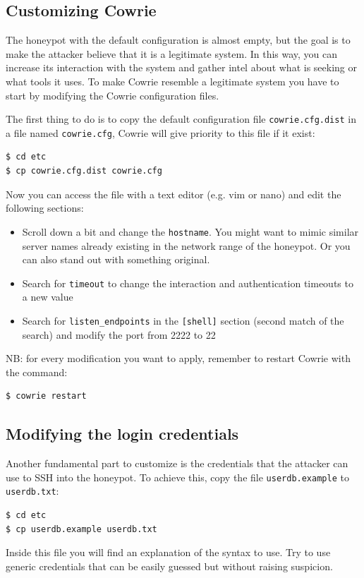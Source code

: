 \documentclass[epsfig,a4paper,11pt,titlepage,oneside,openany]{book}
\begin{document}
\begin{itemize}
\section{Customizing Cowrie}
The honeypot with the default configuration is almost empty, but the goal is to make the attacker believe that it is a legitimate system. In this way, you can increase its interaction with the system and gather intel about what is seeking or what tools it uses. To make Cowrie resemble a legitimate system you have to start by modifying the Cowrie configuration files.

The first thing to do is to copy the default configuration file \texttt{cowrie.cfg.dist} in a file named \texttt{cowrie.cfg}, Cowrie will give priority to this file if it exist:
\begin{lstlisting}[language=bash]
$ cd etc
$ cp cowrie.cfg.dist cowrie.cfg
\end{lstlisting}
Now you can access the file with a text editor (e.g. vim or nano) and edit the following sections:
\begin{itemize}
\item Scroll down a bit and change the \texttt{hostname}. You might want to mimic similar server names already existing in the network range of the honeypot. Or you can also stand out with something original.
\item Search for \texttt{timeout} to change the interaction and authentication timeouts to a new value
\item Search for \texttt{listen\_endpoints} in the \texttt{[shell]} section (second match of the search) and modify the port from 2222 to 22
\end{itemize}

\noindent NB: for every modification you want to apply, remember to restart Cowrie with the command:

\begin{lstlisting}[language=bash]
$ cowrie restart
\end{lstlisting}

\subsection{Modifying the login credentials}
\label{sub:login}
Another fundamental part to customize is the credentials that the attacker can use to SSH into the honeypot. To achieve this, copy the file \texttt{userdb.example} to \texttt{userdb.txt}:
\begin{lstlisting}[language=bash]
$ cd etc
$ cp userdb.example userdb.txt
\end{lstlisting}
Inside this file you will find an explanation of the syntax to use.
Try to use generic credentials that can be easily guessed but without raising suspicion.



\end{itemize}
\end{document}
